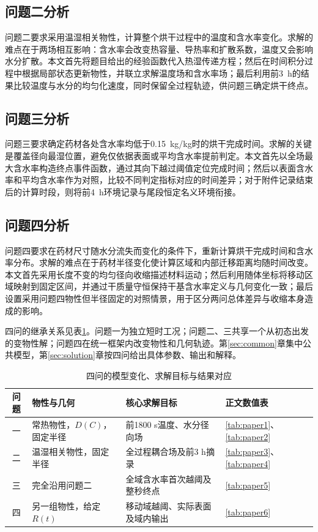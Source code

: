 \subsection{问题二分析}
问题二要求采用温湿相关物性，计算整个烘干过程中的温度和含水率变化。求解的难点在于两场相互影响：含水率会改变热容量、导热率和扩散系数，温度又会影响水分扩散。本文首先将题目给出的经验函数代入热湿传递方程；然后在时间积分过程中根据局部状态更新物性，并联立求解温度场和含水率场；最后利用前3~h的结果比较温度与水分的均匀化速度，同时保留全过程轨迹，供问题三确定烘干终点。

\subsection{问题三分析}
问题三要求确定药材各处含水率均低于0.15~kg/kg时的烘干完成时间。求解的关键是覆盖径向最湿位置，避免仅依据表面或平均含水率提前判定。本文首先以全场最大含水率构造终点事件函数，通过其向下越过阈值定位完成时间；然后以表面含水率和平均含水率作为对照，比较不同判定指标对应的时间差异；对于附件记录结束后的计算时段，则将前4~h环境记录与尾段恒定名义环境衔接。

\subsection{问题四分析}
问题四要求在药材尺寸随水分流失而变化的条件下，重新计算烘干完成时间和含水率分布。求解的难点在于药材半径变化使计算区域和内部迁移距离均随时间改变。本文首先采用长度不变的均匀径向收缩描述材料运动；然后利用随体坐标将移动区域映射到固定区间，并通过干质量守恒保持干基含水率定义与几何变化一致；最后设置采用问题四物性但半径固定的对照情景，用于区分两问总体差异与收缩本身造成的影响。

四问的继承关系见表\ref{tab:task-map}。问题一为独立短时工况；问题二、三共享一个从初态出发的变物性解；问题四在统一框架内改变物性和几何轨迹。第\ref{sec:common}章集中公共模型，第\ref{sec:solution}章按四问给出具体参数、输出和解释。

\begin{table}[htbp]\centering\small
\caption{四问的模型变化、求解目标与结果对应}\label{tab:task-map}
\begin{tabularx}{\linewidth}{cXXl}
\toprule
问题 & 物性与几何 & 核心求解目标 & 正文数值表\\
\midrule
一 & 常热物性，$D(C)$，固定半径 & 前1800 s温度、水分径向场 & \ref{tab:paper1}、\ref{tab:paper2}\\
二 & 温湿相关物性，固定半径 & 全过程耦合场及前3 h摘录 & \ref{tab:paper3}、\ref{tab:paper4}\\
三 & 完全沿用问题二 & 全域含水率首次越阈及整秒终点 & \ref{tab:paper5}\\
四 & 另一组物性，给定$R(t)$ & 移动域越阈、实际表面及域内输出 & \ref{tab:paper6}\\
\bottomrule
\end{tabularx}
\end{table}

